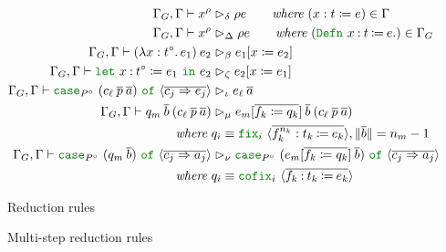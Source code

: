 \begin{figure}
 \hfill
\begin{align*}
\gg \vdash x^\rho & \reduce_\delta \rho e \qquad \textit{where} ~ (x : t \coloneqq e) \in \Gamma \\
\gg \vdash x^\rho & \reduce_\Delta \rho e \qquad \textit{where} ~ (\Defn{x}{t}{e}) \in \Gamma_G \\
\gg \vdash \app{(\abs{x}{t^\circ}{e_1})}{e_2} & \reduce_\beta \subst{e_1}{x}{e_2} \\
\gg \vdash \letin{x}{t^\circ}{e_1}{e_2} & \reduce_\zeta \subst{e_2}{x}{e_1} \\
\gg \vdash \caseof{P^\circ}{(\app{c_\ell}{\vec{p}}{\vec{a}})}{c_j}{e_j} & \reduce_\iota \app{e_\ell}{\vec{a}} \\
\gg \vdash \app{q_m}{\vec{b}}{(\app{c_\ell}{\vec{p}}{\vec{a}})}
  & \reduce_\mu \app{\substvec{e_m}{f_k}{q_k}}{\vec{b}}{(\app{c_\ell}{\vec{p}}{\vec{a}})} \\
  \textit{where} ~ & q_i \equiv \fix{i}{f_k^{n_k}}{t_k}{e_k}, \norm{\vec{b}} = n_m - 1 \\
\gg \vdash \caseof{P^\circ}{(\app{q_m}{\vec{b}})}{c_j}{a_j}
  & \reduce_\nu \caseof{P^\circ}{(\app{\substvec{e_m}{f_k}{q_k}}{\vec{b}})}{c_j}{a_j} \\
  \textit{where} ~ & q_i \equiv \cofix{i}{f_k}{t_k}{e_k}
\end{align*}
\caption{Reduction rules}
\label{fig:reduction}
\end{figure}

\begin{figure}
 \hfill
\vspace{-2ex}

\caption{Multi-step reduction rules}
\label{fig:reductions}
\end{figure}

